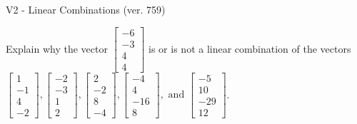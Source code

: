 \begin{exercise}
  \begin{exerciseTitle}V2 - Linear Combinations (ver. 759)\end{exerciseTitle}
  \begin{exerciseStatement}
    Explain why the vector \(\left[\begin{array}{c}
-6 \\
-3 \\
4 \\
4
\end{array}\right]\)  is or is not a linear 
	combination of the vectors \(\left[\begin{array}{c}
1 \\
-1 \\
4 \\
-2
\end{array}\right] , \left[\begin{array}{c}
-2 \\
-3 \\
1 \\
2
\end{array}\right] , \left[\begin{array}{c}
2 \\
-2 \\
8 \\
-4
\end{array}\right] , \left[\begin{array}{c}
-4 \\
4 \\
-16 \\
8
\end{array}\right] , \text{ and } \left[\begin{array}{c}
-5 \\
10 \\
-29 \\
12
\end{array}\right]\).
	



\end{exerciseStatement}
\end{exercise}

